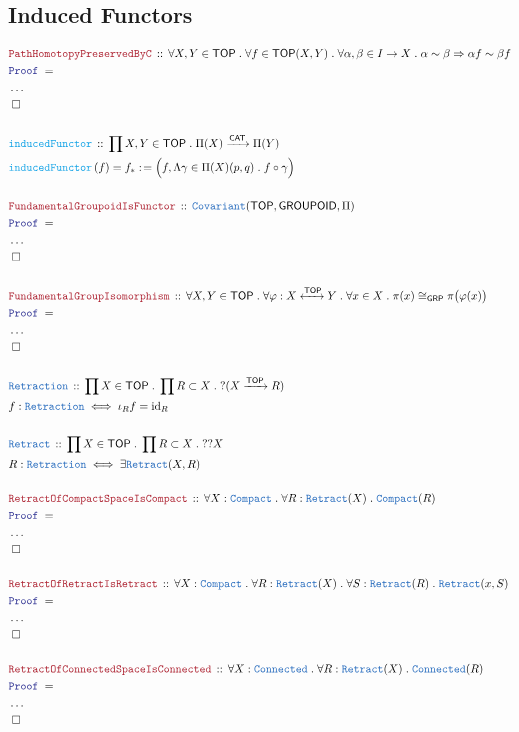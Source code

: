 \documentclass[12pt]{scrartcl}
\newcommand{\TYPE}[1]{\textcolor{NavyBlue}{\mathtt{#1}}}
\newcommand{\FUNC}[1]{\textcolor{Cerulean}{\mathtt{#1}}}
\newcommand{\LOGIC}[1]{\textcolor{Blue}{\mathtt{#1}}}
\newcommand{\THM}[1]{\textcolor{Maroon}{\mathtt{#1}}}
\renewcommand{\.}{\; . \;}
\newcommand{\de}{: \kern 0.1pc =}
\newcommand{\Act}[1]{\left( #1 \right)}
\newcommand{\Theorem}[2]{& \THM{#1} \, :: \, #2 \\ & \Proof = \\ }
\newcommand{\DeclareType}[2]{& \TYPE{#1} \, :: \, #2 \\}
\newcommand{\DefineType}[3]{& #1 : \TYPE{#2} \iff #3 \\}
\newcommand{\DeclareFunc}[2]{& \FUNC{#1} \, :: \, #2 \\}
\newcommand{\DefineNamedFunc}[4]{&  \FUNC{#1}\Act{#2} = #3 \de #4 \\}
\newcommand{\Page}[1]{ \begin{align*} #1 \end{align*}   }
\newcommand{\NoProof}{ & \ldots \\ \EndProof}
\newcommand{\Imply}{\Rightarrow}
\DeclareMathOperator*{\id}{id}
\newcommand{\ToIso}{\xleftrightarrow}
\newcommand{\Arrow}{\xrightarrow}
\newcommand{\QED}{\; \square}
\newcommand{\EndProof}{& \QED \\}
\newcommand{\Proof}{\LOGIC{Proof} \; }
\newcommand{\Cov}{\TYPE{Covariant}}
\newcommand{\CAT}{\mathsf{CAT}}
\newcommand{\TOP}{\mathsf{TOP}}
\newcommand{\GRP}{\mathsf{GRP}}
\begin{document}
\subsection{Induced Functors}
\Page{
	\Theorem{PathHomotopyPreservedByC}
	{
		\forall X,Y \in \TOP \. 
		\forall f \in \TOP(X,Y) \. 
		\forall \alpha,\beta \in I \to X \.
		\alpha \sim \beta \Imply \alpha f \sim \beta f
	}
	\NoProof
	\\
	\DeclareFunc{inducedFunctor}{\prod X,Y \in \TOP \. \Pi(X) \Arrow{\CAT} \Pi(Y)}
	\DefineNamedFunc{inducedFunctor}{f}{f_*}{\Big(f,\Lambda \gamma \in \Pi(X)(p,q) \. f \circ \gamma\Big) }
	\\
	\Theorem{FundamentalGroupoidIsFunctor}
	{
		\Cov(\TOP,\mathsf{GROUPOID},\Pi) 
	}
	\NoProof
	\\
	\Theorem{FundamentalGroupIsomorphism}
	{
		\forall X,Y \in \TOP \. 
		\forall \varphi : X \ToIso{\TOP} Y \.
		\forall x \in X \.
		\pi(x) \cong_{\GRP} \pi\big( \varphi(x) \big)
	}
	\NoProof
	\\
	\DeclareType{Retraction}
	{
		\prod X \in \TOP \. 
		\prod R \subset X \.
		?(X \Arrow{\TOP} R) 
	}
	\DefineType{f}{Retraction}
	{
		\iota_R f = {\id}_R
	}
	\\
	\DeclareType{Retract}
	{
		\prod X \in \TOP \. 
		\prod R \subset X \.
		??X 
	}
	\DefineType{R}{Retraction}
	{
		\exists \TYPE{Retract}(X,R)
	}
	\\
	\Theorem{RetractOfCompactSpaceIsCompact}
	{
		\forall X : \TYPE{Compact} \. 
		\forall R : \TYPE{Retract}(X) \. 
		\TYPE{Compact}(R)
	}
	\NoProof
	\\
	\Theorem{RetractOfRetractIsRetract}
	{
		\forall X : \TYPE{Compact} \. 
		\forall R : \TYPE{Retract}(X) \.
		\forall S : \TYPE{Retract}(R) \. 
		\TYPE{Retract}(x,S)
	}
	\NoProof
	\\
	\Theorem{RetractOfConnectedSpaceIsConnected}
	{
		\forall X : \TYPE{Connected} \. 
		\forall R : \TYPE{Retract}(X) \. 
		\TYPE{Connected}(R)
	}
	\NoProof
}
\end{document}
